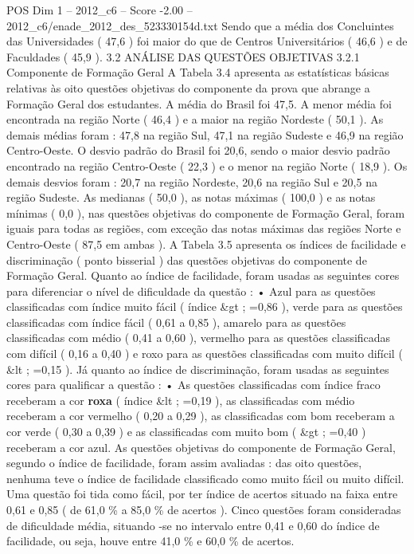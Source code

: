 \begin{textsample}{POS Dim 1 – 2012\_c6 – Score -2.00 – 2012\_c6/enade\_2012\_des\_523330154d.txt}
Sendo que a média dos Concluintes das Universidades ( 47,6 ) foi maior do que de Centros Universitários ( 46,6 ) e de Faculdades ( 45,9 ). 3.2 ANÁLISE DAS QUESTÕES OBJETIVAS 3.2.1 Componente de Formação Geral A Tabela 3.4 apresenta as estatísticas básicas relativas às oito questões objetivas do componente da prova que abrange a Formação Geral dos estudantes.
A média do Brasil foi 47,5.
A menor média foi encontrada na região Norte ( 46,4 ) e a maior na região Nordeste ( 50,1 ).
As demais médias foram : 47,8 na região Sul, 47,1 na região Sudeste e 46,9 na região Centro-Oeste.
O desvio padrão do Brasil foi 20,6, sendo o maior desvio padrão encontrado na região Centro-Oeste ( 22,3 ) e o menor na região Norte ( 18,9 ).
Os demais desvios foram : 20,7 na região Nordeste, 20,6 na região Sul e 20,5 na região Sudeste.
As medianas ( 50,0 ), as notas máximas ( 100,0 ) e as notas mínimas ( 0,0 ), nas questões objetivas do componente de Formação Geral, foram iguais para todas as regiões, com exceção das notas máximas das regiões Norte e Centro-Oeste ( 87,5 em ambas ).
A Tabela 3.5 apresenta os índices de facilidade e discriminação ( ponto bisserial ) das questões objetivas do componente de Formação Geral.
Quanto ao índice de facilidade, foram usadas as seguintes cores para diferenciar o nível de dificuldade da questão : • Azul para as questões classificadas com índice muito fácil ( índice \&gt ; =0,86 ), verde para as questões classificadas com índice fácil ( 0,61 a 0,85 ), amarelo para as questões classificadas com médio ( 0,41 a 0,60 ), vermelho para as questões classificadas com difícil ( 0,16 a 0,40 ) e roxo para as questões classificadas com muito difícil ( \&lt ; =0,15 ).
Já quanto ao índice de discriminação, foram usadas as seguintes cores para qualificar a questão : • As questões classificadas com índice fraco receberam a cor \textbf{roxa} ( índice \&lt ; =0,19 ), as classificadas com médio receberam a cor vermelho ( 0,20 a 0,29 ), as classificadas com bom receberam a cor verde ( 0,30 a 0,39 ) e as classificadas com muito bom ( \&gt ; =0,40 ) receberam a cor azul.
As questões objetivas do componente de Formação Geral, segundo o índice de facilidade, foram assim avaliadas : das oito questões, nenhuma teve o índice de facilidade classificado como muito fácil ou muito difícil.
Uma questão foi tida como fácil, por ter índice de acertos situado na faixa entre 0,61 e 0,85 ( de 61,0 \% a 85,0 \% de acertos ).
Cinco questões foram consideradas de dificuldade média, situando -se no intervalo entre 0,41 e 0,60 do índice de facilidade, ou seja, houve entre 41,0 \% e 60,0 \% de acertos.

\end{textsample}
